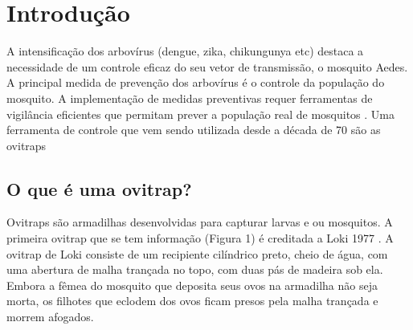 \documentclass[
	12pt,				%
	openright,			%
	oneside,			%
	a4paper,			%
	chapter=TITLE,		%
	english,			%
	brazil				%
	]{abntex2}
\begin{document}

\tableofcontents*
\cleardoublepage



\textual

\setcounter{page}{12}

\chapter{Introdução}
A intensificação dos arbovírus (dengue, zika, chikungunya etc) destaca a necessidade de
um controle eficaz do seu vetor de transmissão, o mosquito Aedes. A principal
medida de prevenção dos arbovírus é o controle da população do mosquito. A
implementação de medidas preventivas requer ferramentas de vigilância eficientes que
permitam prever a população real de mosquitos \cite{ISMALIZA2019}. Uma ferramenta de controle que vem
sendo utilizada desde a década de 70 são as ovitraps \cite{LOK1977}

\section{O que é uma ovitrap?}

Ovitraps são armadilhas desenvolvidas para capturar larvas e ou mosquitos. A primeira ovitrap que se tem informação (Figura 1) é creditada a 
Loki 1977 \cite{LOK1977}. A ovitrap de Loki consiste de um recipiente cilíndrico preto, cheio de água,
com uma abertura de malha trançada no topo, com duas pás de madeira sob ela. Embora a
fêmea do mosquito que deposita seus ovos na armadilha não seja morta, os filhotes que
eclodem dos ovos ficam presos pela malha trançada e morrem afogados.
\end{document}
